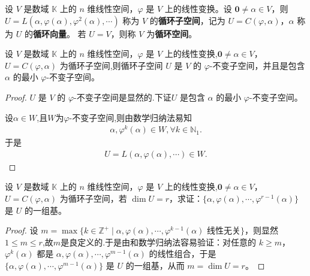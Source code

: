 \documentclass[../../main.tex]{subfiles}
\begin{document}
\begin{definition}[循环子空间]\label{definition:循环子空间和循环空间}
设 \(V\) 是数域 \(\mathbb{K}\) 上的 \(n\) 维线性空间，\(\varphi\) 是 \(V\) 上的线性变换。设 \(\mathbf{0}\neq\alpha\in V\)，则 \(U = L(\alpha,\varphi(\alpha),\varphi^2(\alpha),\cdots)\) 称为 \(V\) 的\textbf{循环子空间}，记为 \(U = C(\varphi,\alpha)\)，\(\alpha\) 称为 \(U\) 的\textbf{循环向量}。
若 \(U = V\)，则称 \(V\) 为\textbf{循环空间}。 
\end{definition}

\begin{theorem}[循环子空间的基本性质]\label{theorem:循环子空间的基本性质}
设 \(V\) 是数域 \(\mathbb{K}\) 上的 \(n\) 维线性空间，\(\varphi\) 是 \(V\) 上的线性变换,\(\mathbf{0}\neq\alpha\in V\)， \(U = C(\varphi,\alpha)\) 为循环子空间,则循环子空间 \(U\) 是 \(V\) 的 \(\varphi\)-不变子空间，并且是包含 \(\alpha\) 的最小 \(\varphi\)-不变子空间。
\end{theorem}
\begin{proof}
\(U\) 是 \(V\) 的 \(\varphi\)-不变子空间是显然的.下证\(U\) 是包含 \(\alpha\) 的最小 \(\varphi\)-不变子空间。

设$\alpha \in W$,且$W$为$\varphi$-不变子空间,则由数学归纳法易知
\begin{align*}
\alpha,\varphi^k(\alpha)\in W,\forall k\in \mathbb{N}_1.
\end{align*}
于是
\begin{align*}
U=L(\alpha,\varphi(\alpha),\cdots)\in W.
\end{align*}
\end{proof}

\begin{theorem}\label{theorem:循环子空间的基}
设 \(V\) 是数域 \(\mathbb{K}\) 上的 \(n\) 维线性空间，\(\varphi\) 是 \(V\) 上的线性变换,\(\mathbf{0}\neq\alpha\in V\)， \(U = C(\varphi,\alpha)\) 为循环子空间，若 \(\dim U = r\)，求证：\(\{\alpha,\varphi(\alpha),\cdots,\varphi^{r - 1}(\alpha)\}\) 是 \(U\) 的一组基。
\end{theorem}
\begin{proof}
设 \(m = \max\{k\in\mathbb{Z}^+\mid\alpha,\varphi(\alpha),\cdots,\varphi^{k - 1}(\alpha)\text{ 线性无关}\}\)，则显然$1\leqslant  m\leqslant  r$,故$m$是良定义的.于是由和数学归纳法容易验证：对任意的 \(k\geqslant  m\)，\(\varphi^k(\alpha)\) 都是 \(\alpha,\varphi(\alpha),\cdots,\varphi^{m - 1}(\alpha)\) 的线性组合，于是 \(\{\alpha,\varphi(\alpha),\cdots,\varphi^{m - 1}(\alpha)\}\) 是 \(U\) 的一组基，从而 \(m = \dim U = r\)。 
\end{proof}
\end{document}
